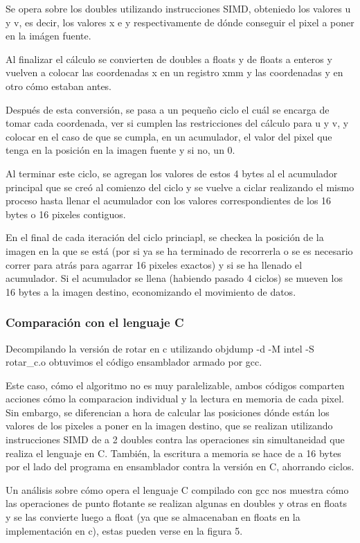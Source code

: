 Se opera sobre los doubles utilizando instrucciones SIMD, obteniedo los valores u y v, es decir, los valores x e y respectivamente de dónde conseguir el pixel a poner en la imágen fuente.

Al finalizar el cálculo se convierten de doubles a floats y de floats a enteros y vuelven a colocar las coordenadas x en un registro xmm y las coordenadas y en otro cómo estaban antes.

Después de esta conversión, se pasa a un pequeño ciclo el cuál se encarga de tomar cada coordenada, ver si cumplen las restricciones del cálculo para u y v, y colocar en el caso de que se cumpla, en un acumulador, el valor del pixel que tenga en la posición en la imagen fuente y si no, un 0.

Al terminar este ciclo, se agregan los valores de estos 4 bytes al el acumulador principal que se creó al comienzo del ciclo y se vuelve a ciclar realizando el mismo proceso hasta llenar el acumulador con los valores correspondientes de los 16 bytes o 16 pixeles contiguos.

En el final de cada iteración del ciclo princiapl, se checkea la posición de la imagen en la que se está (por si ya se ha terminado de recorrerla o se es necesario correr para atrás para agarrar 16 pixeles exactos) y si se ha llenado el acumulador. Si el acumulador se llena (habiendo pasado 4 ciclos) se mueven los 16 bytes a la imagen destino, economizando el movimiento de datos.

\subsubsection{Comparación con el lenguaje C}
Decompilando la versión de rotar en c utilizando objdump -d -M intel -S rotar\_c.o obtuvimos el código ensamblador armado por gcc.

Este caso, cómo el algoritmo no es muy paralelizable, ambos códigos comparten acciones cómo la comparacion individual y la lectura en memoria de cada pixel. Sin embargo, se diferencian a hora de calcular las posiciones dónde están los valores de los pixeles a poner en la imagen destino, que se realizan utilizando instrucciones SIMD de a 2 doubles contra las operaciones sin simultaneidad que realiza el lenguaje en C. También, la escritura a memoria se hace de a 16 bytes por el lado del programa en ensamblador contra la versión en C, ahorrando ciclos.

Un análisis sobre cómo opera el lenguaje C compilado con gcc nos muestra cómo las operaciones de punto flotante se realizan algunas en doubles y otras en floats y se las convierte luego a float (ya que se almacenaban en floats en la implementación en c), estas pueden verse en la figura 5.


